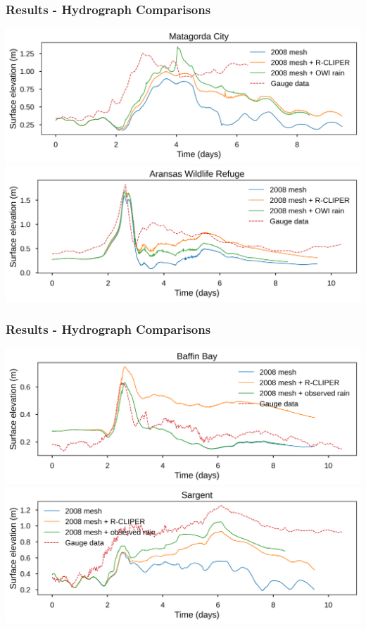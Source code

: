 \documentclass[10pt]{oden_beamer}
\begin{document}
\begin{frame}
  \frametitle{Results - Hydrograph Comparisons}
  \centering
  \includegraphics[width=0.9\linewidth]{matagorda.png}
  \centering
  \includegraphics[width=0.9\linewidth]{aransas_wildlife.png}
\end{frame}

\begin{frame}
  \frametitle{Results - Hydrograph Comparisons}
  \centering
  \includegraphics[width=0.9\linewidth]{baffin_bay.png}
  \centering
  \includegraphics[width=0.9\linewidth]{sargent.png}
\end{frame}
\end{document}
